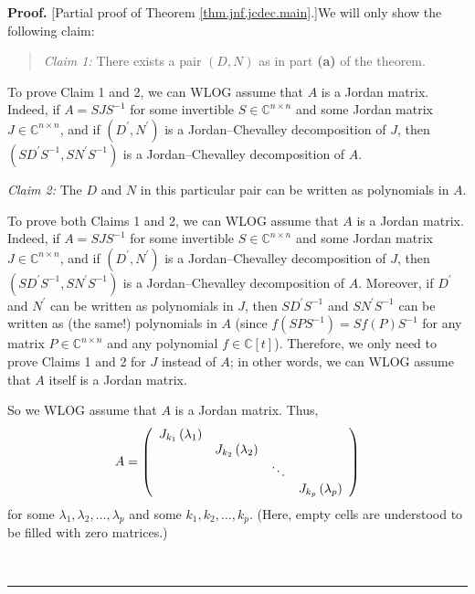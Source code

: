 \documentclass[numbers=enddot,12pt,final,onecolumn,notitlepage]{scrartcl}%
\numberwithin{exer}{subsection}
\theoremstyle{definition}
\newenvironment{statement}{\begin{quote}}{\end{quote}}
\newenvironment{proof}[1][Proof]{\noindent\textbf{#1.} }{\ \rule{0.5em}{0.5em}}
\newenvironment{noncompile}{}{}
\begin{document}
\begin{proof}
[Partial proof of Theorem \ref{thm.jnf.jcdec.main}.]We will only show the
following claim:

\begin{statement}
\textit{Claim 1:} There exists a pair $\left(  D,N\right)  $ as in part
\textbf{(a)} of the theorem.
\end{statement}

To prove Claim 1 and 2, we can WLOG assume that $A$ is a Jordan matrix.
Indeed, if $A=SJS^{-1}$ for some invertible $S\in\mathbb{C}^{n\times n}$ and
some Jordan matrix $J\in\mathbb{C}^{n\times n}$, and if $\left(  D^{\prime
},N^{\prime}\right)  $ is a Jordan--Chevalley decomposition of $J$, then
$\left(  SD^{\prime}S^{-1},SN^{\prime}S^{-1}\right)  $ is a Jordan--Chevalley
decomposition of $A$.

\begin{noncompile}
\textit{Claim 2:} The $D$ and $N$ in this particular pair can be written as
polynomials in $A$.
\end{noncompile}

\begin{noncompile}
To prove both Claims 1 and 2, we can WLOG assume that $A$ is a Jordan matrix.
Indeed, if $A=SJS^{-1}$ for some invertible $S\in\mathbb{C}^{n\times n}$ and
some Jordan matrix $J\in\mathbb{C}^{n\times n}$, and if $\left(  D^{\prime
},N^{\prime}\right)  $ is a Jordan--Chevalley decomposition of $J$, then
$\left(  SD^{\prime}S^{-1},SN^{\prime}S^{-1}\right)  $ is a Jordan--Chevalley
decomposition of $A$. Moreover, if $D^{\prime}$ and $N^{\prime}$ can be
written as polynomials in $J$, then $SD^{\prime}S^{-1}$ and $SN^{\prime}%
S^{-1}$ can be written as (the same!) polynomials in $A$ (since $f\left(
SPS^{-1}\right)  =Sf\left(  P\right)  S^{-1}$ for any matrix $P\in
\mathbb{C}^{n\times n}$ and any polynomial $f\in\mathbb{C}\left[  t\right]
$). Therefore, we only need to prove Claims 1 and 2 for $J$ instead of $A$; in
other words, we can WLOG assume that $A$ itself is a Jordan matrix.
\end{noncompile}

So we WLOG assume that $A$ is a Jordan matrix. Thus,%
\[
A=\left(
\begin{array}
[c]{cccc}%
J_{k_{1}}\left(  \lambda_{1}\right)  &  &  & \\
& J_{k_{2}}\left(  \lambda_{2}\right)  &  & \\
&  & \ddots & \\
&  &  & J_{k_{p}}\left(  \lambda_{p}\right)
\end{array}
\right)
\]
for some $\lambda_{1},\lambda_{2},\ldots,\lambda_{p}$ and some $k_{1}%
,k_{2},\ldots,k_{p}$. (Here, empty cells are understood to be filled with zero matrices.)


\end{proof}
\end{document}
